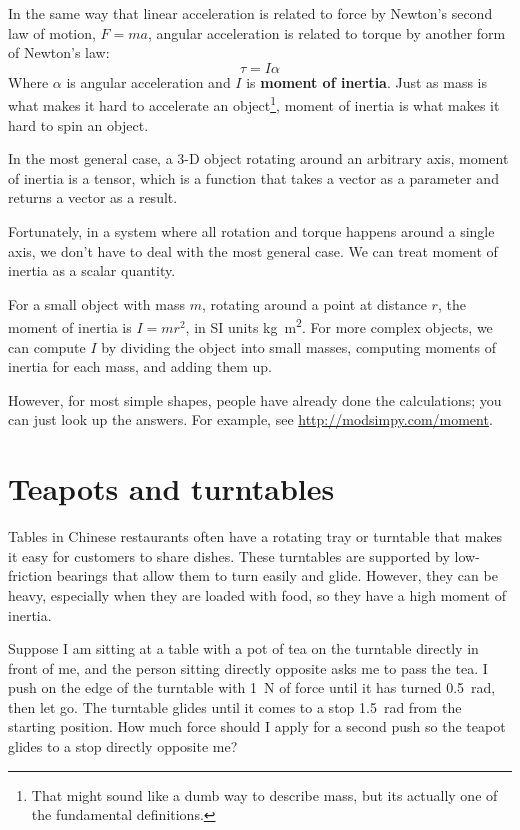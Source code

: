 \documentclass[12pt]{book}
\theoremstyle{exercise}
\begin{document}
In the same way that linear acceleration is related to force by Newton's second law of motion, $F=ma$, angular acceleration is related to torque by another form of Newton's law:
%
\[ \tau = I \alpha \]
%
Where $\alpha$ is angular acceleration and $I$ is {\bf moment of inertia}.  Just as mass is what makes it hard to accelerate an object\footnote{That might sound like a dumb way to describe mass, but its actually one of the fundamental definitions.}, moment of inertia is what makes it hard to spin an object.


In the most general case, a 3-D object rotating around an arbitrary axis, moment of inertia is a tensor, which is a function that takes a vector as a parameter and returns a vector as a result.


Fortunately, in a system where all rotation and torque happens around a single axis, we don't have to deal with the most general case.  We can treat moment of inertia as a scalar quantity.


For a small object with mass $m$, rotating around a point at distance $r$, the moment of inertia is $I = m r^2$, in SI units \si{\kilogram\meter\squared}.  For more complex objects, we can compute $I$ by dividing the object into small masses, computing moments of inertia for each mass, and adding them up.

However, for most simple shapes, people have already done the calculations; you can just look up the answers.  For example, see \url{http://modsimpy.com/moment}.


\section{Teapots and turntables}

Tables in Chinese restaurants often have a rotating tray or turntable
that makes it easy for customers to share dishes. These turntables are
supported by low-friction bearings that allow them to turn easily and
glide. However, they can be heavy, especially when they are loaded with
food, so they have a high moment of inertia.


Suppose I am sitting at a table with a pot of tea on the turntable
directly in front of me, and the person sitting directly opposite asks
me to pass the tea. I push on the edge of the turntable with \SI{1}{\newton} of force until it has turned \SI{0.5}{\radian}, then let go. The turntable glides until it comes to a stop \SI{1.5}{\radian} from the starting position. How much force should I apply for a second push so the teapot glides to a
stop directly opposite me?
\end{document}
